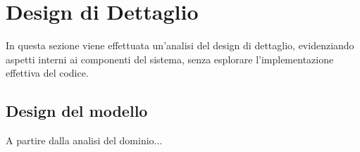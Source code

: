 \section{Design di Dettaglio}
In questa sezione viene effettuata un'analisi del design di dettaglio, evidenziando aspetti interni ai componenti del
sistema, senza esplorare l'implementazione effettiva del codice.

\subsection{Design del modello}
A partire dalla analisi del dominio...

